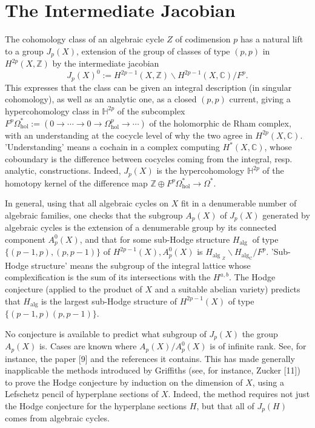 \documentclass[12pt,twoside]{book}
\theoremstyle{plain}
\theoremstyle{definition}
\theoremstyle{remark}
\numberwithin{equation}{section}
\begin{document}
\section{\bf The Intermediate Jacobian}
The cohomology class of an algebraic cycle $Z$ of codimension $p$ has a natural lift to a group $J_p(X)$, extension of the group of classes of type $(p, p)$ in $H^{2 p}(X, \mathbb{Z})$ by the intermediate jacobian
$$
J_p(X)^0:=H^{2 p-1}(X, \mathbb{Z}) \backslash H^{2 p-1}(X, \mathbb{C}) / F^p .
$$
This expresses that the class can be given an integral description (in singular cohomology), as well as an analytic one, as a closed $(p, p)$ current, giving a hypercohomology class in $\mathbb{H}^{2 p}$ of the subcomplex $F^p \Omega_{\mathrm{hol}}^*:=\left(0 \rightarrow \cdots \rightarrow 0 \rightarrow \Omega_{\mathrm{hol}}^p \rightarrow \cdots\right)$ of the holomorphic de Rham complex, with an understanding at the cocycle level of why the two agree in $H^{2 p}(X, \mathbb{C})$. 'Understanding' means a cochain in a complex computing $H^*(X, \mathbb{C})$, whose coboundary is the difference between cocycles coming from the integral, resp. analytic, constructions. Indeed, $J_p(X)$ is the hypercohomology $\mathbb{H}^{2 p}$ of the homotopy kernel of the difference map $\mathbb{Z} \oplus F^p \Omega_{\mathrm{hol}}^* \rightarrow \Omega^*$.

In general, using that all algebraic cycles on $X$ fit in a denumerable number of algebraic families, one checks that the subgroup $A_p(X)$ of $J_p(X)$ generated by algebraic cycles is the extension of a denumerable group by its connected component $A_p^0(X)$, and that for some sub-Hodge structure $H_{\text {alg }}$ of type $\{(p-1, p),(p, p-1)\}$ of $H^{2 p-1}(X), A_p^0(X)$ is $H_{\text {alg }_Z} \backslash H_{\mathrm{alg}_{\mathrm{C}}} / F^p$. 'Sub-Hodge structure' means the subgroup of the integral lattice whose complexification is the sum of its intersections with the $H^{a, b}$. The Hodge conjecture (applied to the product of $X$ and a suitable abelian variety) predicts that $H_{\mathrm{alg}}$ is the largest sub-Hodge structure of $H^{2 p-1}(X)$ of type $\{(p-1, p)(p, p-1)\}$.

No conjecture is available to predict what subgroup of $J_p(X)$ the group $A_p(X)$ is. Cases are known where $A_p(X) / A_p^0(X)$ is of infinite rank. See, for instance, the paper [9] and the references it contains. This has made generally inapplicable the methods introduced by Griffiths (see, for instance, Zucker [11]) to prove the Hodge conjecture by induction on the dimension of $X$, using a Lefschetz pencil of hyperplane sections of $X$. Indeed, the method requires not just the Hodge conjecture for the hyperplane sections $H$, but that all of $J_p(H)$ comes from algebraic cycles.
\end{document}
